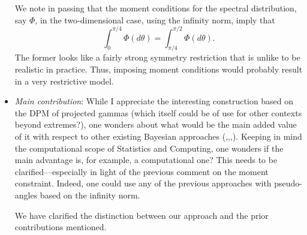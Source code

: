 \documentclass[10pt]{article}
\newcommand{\comment}[1]{\textcolor{teal}{#1}}
\newcommand{\bruno}[1]{\textcolor{red}{#1}}
\begin{document}
\begin{itemize}
We note in passing that the moment conditions for the spectral distribution, say 
    $\Phi$, in the two-dimensional case, using the infinity norm, imply that 
    \[
        \int_0^{\pi/4} \Phi(d\theta) = \int_{\pi/4}^{\pi/2}
    \Phi(d\theta).
    \]
    The former looks like a fairly strong symmetry restriction that is unlike to 
    be realistic in practice. Thus, imposing moment conditions would probably 
    result in a very restrictive model.


\item \emph{Main contribution}: While I appreciate the interesting construction 
    based on the DPM of projected gammas (which itself could be of use for other 
    contexts beyond extremes?), one wonders about what would be the main added 
    value of it with respect to other existing Bayesian approaches 
    (\cite{boldi2007},\cite{guillotte2011},\cite{SaNa2014},\cite{hanson2017}).
    Keeping in mind the computational scope of Statistics and Computing, one 
    wonders if the main advantage is, for example, a computational one? This 
    needs to be clarified—especially in light of the previous comment on the 
    moment constraint. Indeed, one could use any of the previous approaches with 
    pseudo-angles based on the infinity norm.

We have clarified the distinction between our approach and the prior contributions
    mentioned.

    


\end{itemize}
\end{document}
